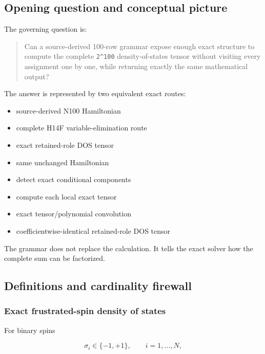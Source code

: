 \subsection{Opening question and conceptual
picture}\label{viii-ch01-opening-question-and-conceptual-picture}

The governing question is:

\begin{quote}
Can a source-derived 100-row grammar expose enough exact structure to
compute the complete \texttt{2\^{}100} density-of-states tensor without
visiting every assignment one by one, while returning exactly the same
mathematical output?
\end{quote}

The answer is represented by two equivalent exact routes:

\begin{itemize}
\tightlist
\item
  source-derived N100 Hamiltonian
\item
  complete H14F variable-elimination route
\item
  exact retained-role DOS tensor
\item
  same unchanged Hamiltonian
\item
  detect exact conditional components
\item
  compute each local exact tensor
\item
  exact tensor/polynomial convolution
\item
  coefficientwise-identical retained-role DOS tensor
\end{itemize}

The grammar does not replace the calculation. It tells the exact solver
how the complete sum can be factorized.

\subsection{Definitions and cardinality
firewall}\label{viii-ch01-definitions-and-cardinality-firewall}

\subsubsection{Exact frustrated-spin density of
states}\label{viii-ch01-exact-frustrated-spin-density-of-states}

For binary spins

\[
\sigma_i\in\{-1,+1\},\qquad i=1,\ldots,N,
\]

